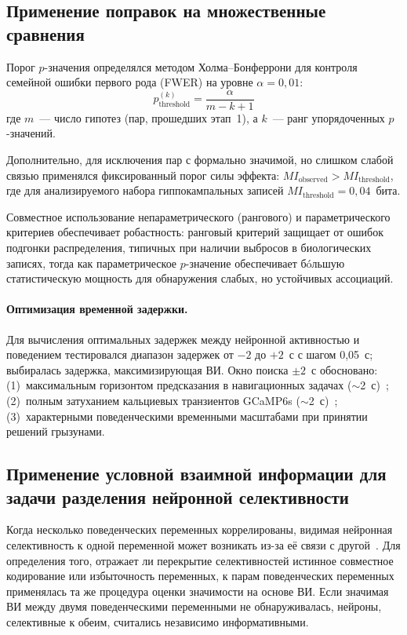 \subsection{Применение поправок на множественные сравнения}\label{sec:intense_mc}

Порог $p$-значения определялся методом Холма--Бонферрони для контроля семейной ошибки первого рода (FWER) на уровне $\alpha = 0{,}01$:
$$p_{\text{threshold}}^{(k)} = \frac{\alpha}{m - k + 1}$$
где $m$~--- число гипотез (пар, прошедших этап~1), а $k$~--- ранг упорядоченных $p$-значений.

Дополнительно, для исключения пар с формально значимой, но слишком слабой связью применялся фиксированный порог силы эффекта: $MI_{\text{observed}} > MI_{\text{threshold}}$, где для анализируемого набора гиппокампальных записей $MI_{\text{threshold}} = 0{,}04$~бита.

Совместное использование непараметрического (рангового) и параметрического критериев обеспечивает робастность: ранговый критерий защищает от ошибок подгонки распределения, типичных при наличии выбросов в биологических записях, тогда как параметрическое $p$-значение обеспечивает бóльшую статистическую мощность для обнаружения слабых, но устойчивых ассоциаций.

\paragraph{Оптимизация временной задержки.}

Для вычисления оптимальных задержек между нейронной активностью и поведением тестировался диапазон задержек от $-2$ до $+2$~с с шагом 0{,}05~с; выбиралась задержка, максимизирующая ВИ. Окно поиска $\pm 2$~с обосновано: (1)~максимальным горизонтом предсказания в навигационных задачах ($\sim$2~с)~\cite{Lian2022}; (2)~полным затуханием кальциевых транзиентов GCaMP6s ($\sim$2~с)~\cite{Zhang2023}; (3)~характерными поведенческими временными масштабами при принятии решений грызунами.


\subsection{Применение условной взаимной информации для задачи разделения нейронной селективности}\label{sec:intense_disentangle}

Когда несколько поведенческих переменных коррелированы, видимая нейронная селективность к одной переменной может возникать из-за её связи с другой~\cite{mix,mix3}. Для определения того, отражает ли перекрытие селективностей истинное совместное кодирование или избыточность переменных, к парам поведенческих переменных применялась та же процедура оценки значимости на основе ВИ. Если значимая ВИ между двумя поведенческими переменными не обнаруживалась, нейроны, селективные к обеим, считались независимо информативными.

